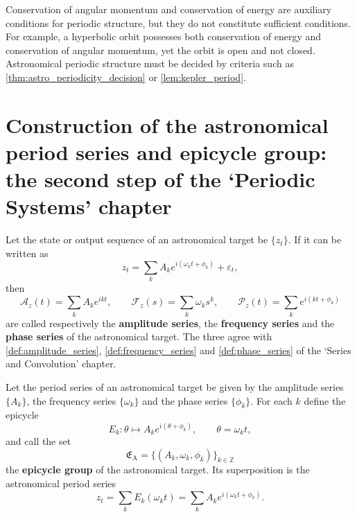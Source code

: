 \begin{remark}\label{rem:astro_invariant_not_period}
Conservation of angular momentum and conservation of energy are auxiliary conditions for periodic structure, but they do not constitute sufficient conditions. For example, a hyperbolic orbit possesses both conservation of energy and conservation of angular momentum, yet the orbit is open and not closed. Astronomical periodic structure must be decided by criteria such as \cref{thm:astro_periodicity_decision} or \cref{lem:kepler_period}.
\end{remark}

\section{Construction of the astronomical period series and epicycle group: the second step of the `Periodic Systems' chapter}
\label{sec:astro_series_construction}

\begin{definition}\label{def:astro_series}
Let the state or output sequence of an astronomical target be \(\{z_t\}\). If it can be written as
\[
z_t=\sum_k A_k e^{i(\omega_k t+\phi_k)}+\varepsilon_t,
\]
then
\[
\mathcal A_z(t)=\sum_k A_k e^{ikt},\qquad
\mathcal F_z(s)=\sum_k \omega_k s^k,\qquad
\mathcal P_z(t)=\sum_k e^{i(kt+\phi_k)}
\]
are called respectively the \textbf{amplitude series}, the \textbf{frequency series} and the \textbf{phase series} of the astronomical target. The three agree with \cref{def:amplitude_series}, \cref{def:frequency_series} and \cref{def:phase_series} of the `Series and Convolution' chapter.
\end{definition}

\begin{definition}\label{def:astro_epicycle_group}
Let the period series of an astronomical target be given by the amplitude series \(\{A_k\}\), the frequency series \(\{\omega_k\}\) and the phase series \(\{\phi_k\}\). For each \(k\) define the epicycle
\[
E_k:\theta\mapsto A_k e^{i(\theta+\phi_k)},\qquad \theta=\omega_k t,
\]
and call the set
\[
\mathfrak E_{\mathrm{A}}=\{(A_k,\omega_k,\phi_k)\}_{k\in\mathbb Z}
\]
the \textbf{epicycle group} of the astronomical target. Its superposition is the astronomical period series
\[
z_t=\sum_k E_k(\omega_k t)=\sum_k A_k e^{i(\omega_k t+\phi_k)}.
\]
\end{definition}

